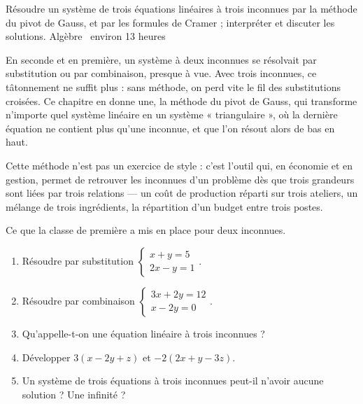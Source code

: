   {Résoudre un système de trois équations linéaires à trois inconnues par la
   méthode du pivot de Gauss, et par les formules de Cramer ; interpréter et
   discuter les solutions.}
  {Algèbre \textbullet\ environ 13 heures}

En seconde et en première, un système à deux inconnues se résolvait par
substitution ou par combinaison, presque à vue. Avec trois inconnues, ce
tâtonnement ne suffit plus : sans méthode, on perd vite le fil des
substitutions croisées. Ce chapitre en donne une, la méthode du pivot de
Gauss, qui transforme n'importe quel système linéaire en un système
« triangulaire », où la dernière équation ne contient plus qu'une inconnue, et
que l'on résout alors de bas en haut.

Cette méthode n'est pas un exercice de style : c'est l'outil qui, en
économie et en gestion, permet de retrouver les inconnues d'un problème dès
que trois grandeurs sont liées par trois relations — un coût de production
réparti sur trois ateliers, un mélange de trois ingrédients, la répartition
d'un budget entre trois postes.

\begin{revision}
Ce que la classe de première a mis en place pour deux inconnues.

\begin{enumerate}[label=\textbf{\arabic*.}, leftmargin=*, itemsep=0.35em]
  \item Résoudre par substitution
        $\begin{cases} x+y = 5 \\ 2x-y = 1 \end{cases}$.
  \item Résoudre par combinaison
        $\begin{cases} 3x+2y = 12 \\ x-2y = 0 \end{cases}$.
  \item Qu'appelle-t-on une équation linéaire à trois inconnues ?
  \item Développer $3(x-2y+z)$ et $-2(2x+y-3z)$.
  \item Un système de trois équations à trois inconnues peut-il n'avoir aucune
        solution ? Une infinité ?
\end{enumerate}
\end{revision}

